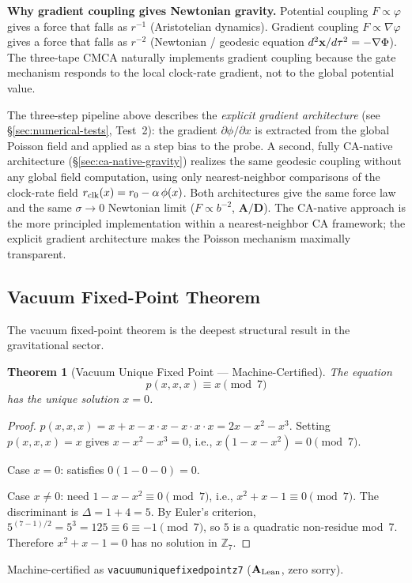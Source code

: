 \documentclass[11pt]{article}
\newtheorem{theorem}{Theorem}[section]
\theoremstyle{remark}
\newcommand{\ZS}{\mathbb{Z}_7}
\newcommand{\lean}[1]{%
  \penalty-100
  \begingroup\def\_{\textunderscore\allowbreak}\texttt{#1}\endgroup}
\newcommand{\CatAL}{\ensuremath{\textbf{A}_{\rm Lean}}}
\newcommand{\CatAD}{\textbf{A/D}}
\newcommand{\CMCA}{\text{CMCA}}
\begin{document}
\textbf{Why gradient coupling gives Newtonian gravity.} Potential coupling
$F \propto \varphi$ gives a force that falls as $r^{-1}$ (Aristotelian
dynamics). Gradient coupling $F \propto \nabla\varphi$ gives a force that
falls as $r^{-2}$ (Newtonian / geodesic equation $d^2{\bf x}/d\tau^2 =
-\nabla\Phi$). The three-tape $\CMCA$ naturally implements gradient coupling
because the gate mechanism responds to the local clock-rate gradient, not
to the global potential value.

The three-step pipeline above describes the \emph{explicit gradient architecture}
(see \S\ref{sec:numerical-tests}, Test~2): the gradient $\partial\phi/\partial x$
is extracted from the global Poisson field and applied as a step bias to the probe.
A second, fully CA-native architecture (\S\ref{sec:ca-native-gravity}) realizes
the same geodesic coupling without any global field computation, using only
nearest-neighbor comparisons of the clock-rate field
$r_{\rm clk}(x) = r_0 - \alpha\,\phi(x)$. Both architectures give the same
force law and the same $\sigma\to 0$ Newtonian limit ($F\propto b^{-2}$,
$\CatAD$). The CA-native approach is the more principled implementation within
a nearest-neighbor CA framework; the explicit gradient architecture makes the
Poisson mechanism maximally transparent.

\subsection{Vacuum Fixed-Point Theorem}

The vacuum fixed-point theorem is the deepest structural result in the
gravitational sector.

\begin{theorem}[Vacuum Unique Fixed Point --- Machine-Certified]
\label{thm:vfp}
The equation
\[
  p(x,x,x) \equiv x \pmod{7}
\]
has the unique solution $x = 0$.
\end{theorem}
\begin{proof}
$p(x,x,x) = x + x - x\cdot x - x\cdot x\cdot x = 2x - x^2 - x^3$.
Setting $p(x,x,x) = x$ gives $x - x^2 - x^3 = 0$, i.e., $x(1 - x - x^2)
= 0 \pmod{7}$.

Case $x = 0$: satisfies $0(1 - 0 - 0) = 0$. \checkmark

Case $x \neq 0$: need $1 - x - x^2 \equiv 0 \pmod{7}$, i.e.,
$x^2 + x - 1 \equiv 0 \pmod{7}$. The discriminant is $\Delta = 1 + 4 = 5$.
By Euler's criterion, $5^{(7-1)/2} = 5^3 = 125 \equiv 6 \equiv -1
\pmod{7}$, so $5$ is a quadratic non-residue mod~7. Therefore
$x^2 + x - 1 = 0$ has no solution in $\ZS$.
\end{proof}
Machine-certified as \lean{vacuum\_unique\_fixed\_point\_z7}
($\CatAL$, zero sorry).
\end{document}
